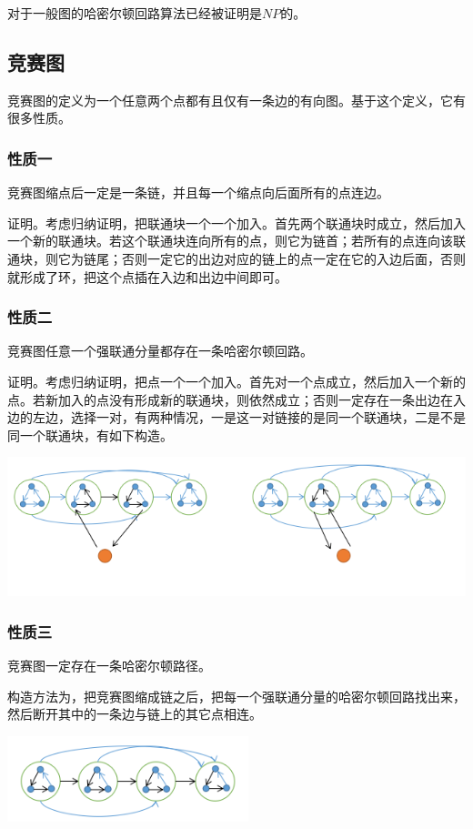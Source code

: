 \documentclass[UTF-8]{ctexart}
\begin{document}
				对于一般图的哈密尔顿回路算法已经被证明是$NP$的。
				\subsection{竞赛图}
				竞赛图的定义为一个任意两个点都有且仅有一条边的有向图。基于这个定义，它有很多性质。
				\subsubsection{性质一}
				竞赛图缩点后一定是一条链，并且每一个缩点向后面所有的点连边。
				
				证明。考虑归纳证明，把联通块一个一个加入。首先两个联通块时成立，然后加入一个新的联通块。若这个联通块连向所有的点，则它为链首；若所有的点连向该联通块，则它为链尾；否则一定它的出边对应的链上的点一定在它的入边后面，否则就形成了环，把这个点插在入边和出边中间即可。
				\subsubsection{性质二}
				竞赛图任意一个强联通分量都存在一条哈密尔顿回路。
				
				证明。考虑归纳证明，把点一个一个加入。首先对一个点成立，然后加入一个新的点。若新加入的点没有形成新的联通块，则依然成立；否则一定存在一条出边在入边的左边，选择一对，有两种情况，一是这一对链接的是同一个联通块，二是不是同一个联通块，有如下构造。
				\begin{center}
					\includegraphics[width=15cm]{file//hamiltonian1.png}
				\end{center}
				\subsubsection{性质三}
				竞赛图一定存在一条哈密尔顿路径。
				
				构造方法为，把竞赛图缩成链之后，把每一个强联通分量的哈密尔顿回路找出来，然后断开其中的一条边与链上的其它点相连。
				\begin{center}
					\includegraphics[width=7cm]{file//hamiltonian2.png}
				\end{center}
\end{document}
